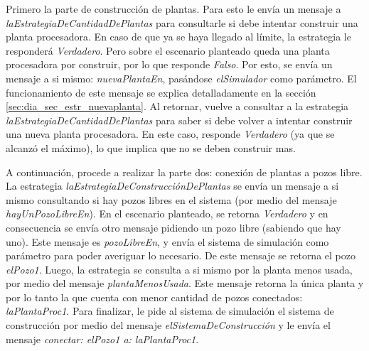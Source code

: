 \par Primero la parte de construcción de plantas. Para esto le envía un mensaje a \textit{laEstrategiaDeCantidadDePlantas} para consultarle si debe intentar construir una planta procesadora. En caso de que ya se haya llegado al límite, la estrategia le responderá \textit{Verdadero}. Pero sobre el escenario planteado queda una planta procesadora por construir, por lo que responde \textit{Falso}. Por esto, se envía un mensaje a si mismo: \textit{nuevaPlantaEn}, pasándose \textit{elSimulador} como parámetro. El funcionamiento de este mensaje se explica detalladamente en la sección \ref{sec:dia_sec_estr_nuevaplanta}. Al retornar, vuelve a consultar a la estrategia \textit{laEstrategiaDeCantidadDePlantas} para saber si debe volver a intentar construir una nueva planta procesadora. En este caso, responde \textit{Verdadero} (ya que se alcanzó el máximo), lo que implica que no se deben construir mas.
\par A continuación, procede a realizar la parte dos: conexión de plantas a pozos libre. La estrategia \textit{laEstrategiaDeConstrucciónDePlantas} se envía un mensaje a si mismo consultando si hay pozos libres en el sistema (por medio del mensaje \textit{hayUnPozoLibreEn}). En el escenario planteado, se retorna \textit{Verdadero} y en consecuencia se envía otro mensaje pidiendo un pozo libre (sabiendo que hay uno). Este mensaje es \textit{pozoLibreEn}, y envía el sistema de simulación como parámetro para poder averiguar lo necesario. De este mensaje se retorna el pozo \textit{elPozo1}. Luego, la estrategia se consulta a si mismo por la planta menos usada, por medio del mensaje \textit{plantaMenosUsada}. Este mensaje retorna la única planta y por lo tanto la que cuenta con menor cantidad de pozos conectados: \textit{laPlantaProc1}. Para finalizar, le pide al sistema de simulación el sistema de construcción por medio del mensaje \textit{elSistemaDeConstrucción} y le envía el mensaje \textit{conectar: elPozo1 a: laPlantaProc1}.

